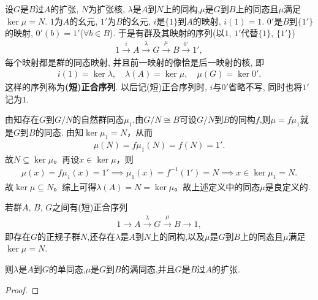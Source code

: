 \documentclass[../../main.tex]{subfiles}%
\begin{document}
\begin{definition}
设$G$是$B$过$A$的扩张, $N$为扩张核, $\lambda$是$A$到$N$上的同构,$\mu$是$G$到$B$上的同态且$\mu$满足$\ker\mu = N$. $1$为$A$的幺元, $1'$为$B$的幺元, $i$是$\{1\}$到$A$的映射, $i(1)=1$. $0'$是$B$到$\{1'\}$的映射, $0'(b)=1'$($\forall b\in B$). 于是有群及其映射的序列(以$1$, $1'$代替$\{1\}$, $\{1'\}$)
\begin{align*}
1 \stackrel{i}{\longrightarrow} A \stackrel{\lambda}{\longrightarrow} G \stackrel{\mu}{\longrightarrow} B \stackrel{0'}{\longrightarrow} 1',
\end{align*}
每个映射都是群的同态映射, 并且前一映射的像恰是后一映射的核, 即
\begin{align*}
i(1) = \ker\lambda, \quad\lambda(A) = \ker \mu  , \quad \mu(G) = \ker 0'.
\end{align*}
这样的序列称为\textbf{(短)正合序列}.
以后记(短)正合序列时, $i$与$0'$省略不写, 同时也将$1'$记为$1$.
\end{definition}
\begin{remark}
由知存在$G$到$G/N$的自然群同态$\mu_1$.由$G/N\cong B$可设$G/N$到$B$的同构$f$,则$\mu = f\mu_1$就是$G$到$B$的同态.
由知$ \ker \mu_1 = N $，从而
\begin{align*}
\mu(N) = f\mu_1(N) = f(N) = 1'.
\end{align*}
故$ N \subseteq \ker \mu $。再设$ x \in \ker \mu $，则
\begin{align*}
\mu(x) = f\mu_1(x) = 1' \implies \mu_1(x) = f^{-1}(1') = N \implies x \in \ker \mu_1 = N.
\end{align*}
故$ \ker \mu \subseteq N $。综上可得$ \lambda(A) = N = \ker \mu $。故上述定义中的同态$\mu$是良定义的.

\end{remark}

\begin{proposition}\label{proposition:正合序列的基本性质}
若群$A$, $B$, $G$之间有(短)正合序列
\begin{align*}
1\longrightarrow A \stackrel{\lambda}{\longrightarrow} G \stackrel{\mu}{\longrightarrow} B\longrightarrow 1,
\end{align*}
即存在$G$的正规子群$N$,还存在$\lambda$是$A$到$N$上的同构,以及$\mu$是$G$到$B$上的同态且$\mu$满足$\ker\mu = N$.

则$\lambda$是$A$到$G$的单同态,$\mu$是$G$到$B$的满同态,并且$G$是$B$过$A$的扩张.
\end{proposition}
\begin{proof}

\end{proof}
\end{document}
